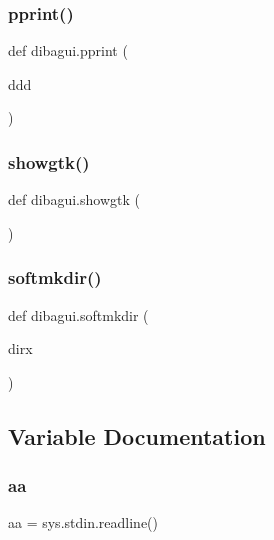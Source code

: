 \mbox{\label{namespacedibagui_ad90cbb2f2f6f630b3d1702505a041b97}} 
\subsubsection{\texorpdfstring{pprint()}{pprint()}}
{\footnotesize\ttfamily def dibagui.\+pprint (\begin{DoxyParamCaption}\item[{}]{ddd }\end{DoxyParamCaption})}

\mbox{\label{namespacedibagui_aafe5e93f05012b5ea1b7a6a2ea5e304e}} 
\subsubsection{\texorpdfstring{showgtk()}{showgtk()}}
{\footnotesize\ttfamily def dibagui.\+showgtk (\begin{DoxyParamCaption}{ }\end{DoxyParamCaption})}

\mbox{\label{namespacedibagui_ab81281419da07ffb44732c0d233b7134}} 
\subsubsection{\texorpdfstring{softmkdir()}{softmkdir()}}
{\footnotesize\ttfamily def dibagui.\+softmkdir (\begin{DoxyParamCaption}\item[{}]{dirx }\end{DoxyParamCaption})}



\subsection{Variable Documentation}
\mbox{\label{namespacedibagui_a74b87337454200d4d33f80c4663dc5e5}} 
\subsubsection{\texorpdfstring{aa}{aa}}
{\footnotesize\ttfamily aa = sys.\+stdin.\+readline()}

